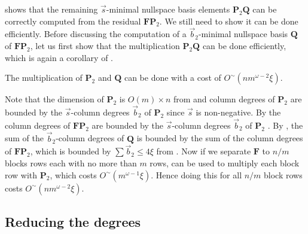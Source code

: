  shows that
the remaining $\vec{s}$-minimal nullspace basis elements $\mathbf{P}_{2}\mathbf{Q}$
can be correctly computed from the residual $\mathbf{F}\mathbf{P}_{2}$.
We still need to show it can be done efficiently. Before discussing
the computation of a $\vec{b}_{2}$-minimal nullspace basis $\mathbf{Q}$
of $\mathbf{F}\mathbf{P}_{2}$, let us first show that the multiplication
$\mathbf{P}_{2}\mathbf{Q}$ can be done efficiently, which is again
a corollary of .
\begin{lem}
\label{cor:multiplyingP2Q}The multiplication of $\mathbf{P}_{2}$
and $\mathbf{Q}$ can be done with a cost of $O^{\sim}\left(nm^{\omega-2}\xi\right)$.\end{lem}
\begin{pf}
Note that the dimension of $\mathbf{P}_{2}$ is $O(m)\times n$ from
and column
degrees of $\mathbf{P}_{2}$ are bounded by the $\vec{s}$-column
degrees $\vec{b}_{2}$ of $\mathbf{P}_{2}$ since $\vec{s}$ is non-negative.
By  the column degrees of $\mathbf{F}\mathbf{P}_{2}$
are bounded by the $\vec{s}$-column degrees $\vec{b}_{2}$ of $\mathbf{P}_{2}$
. By ,
the sum of the $\vec{b}_{2}$-column degrees of $\mathbf{Q}$ is bounded
by the sum of the column degrees of $\mathbf{F}\mathbf{P}_{2}$, which
is bounded by $\sum\vec{b}_{2}\le4\xi$ from .
Now if we separate $\mathbf{F}$ to $n/m$ blocks rows each with no
more than $m$ rows,  can
be used to multiply each block row with $\mathbf{P}_{2}$, which costs
$O^{\sim}(m^{\omega-1}\xi)$. Hence doing this for all $n/m$ block
rows costs $O^{\sim}\left(nm^{\omega-2}\xi\right)$.
\end{pf}

\subsection{Reducing the degrees}

